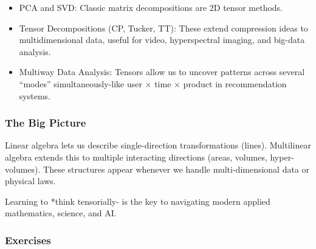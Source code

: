 \documentclass[
  letterpaper,
  DIV=11,
  numbers=noendperiod]{scrreprt}
\providecommand{\tightlist}{%
  \setlength{\itemsep}{0pt}\setlength{\parskip}{0pt}}
\begin{document}
\begin{itemize}
\tightlist
\item
  PCA and SVD: Classic matrix decompositions are 2D tensor methods.
\item
  Tensor Decompositions (CP, Tucker, TT): These extend compression ideas
  to multidimensional data, useful for video, hyperspectral imaging, and
  big-data analysis.
\item
  Multiway Data Analysis: Tensors allow us to uncover patterns across
  several ``modes'' simultaneously-like user × time × product in
  recommendation systems.
\end{itemize}

\subsubsection{The Big Picture}\label{the-big-picture}

Linear algebra lets us describe single-direction transformations
(lines). Multilinear algebra extends this to multiple interacting
directions (areas, volumes, hyper-volumes). These structures appear
whenever we handle multi-dimensional data or physical laws.

Learning to *think tensorially- is the key to navigating modern applied
mathematics, science, and AI.

\subsubsection{Exercises}\label{exercises-2}
\end{document}
